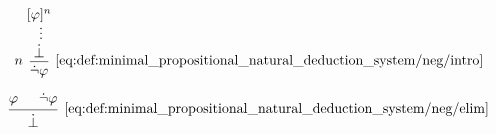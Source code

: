 \begin{definition}
\begin{thmenum}
    \begin{minipage}{0.45\textwidth}
      \begin{equation*}\taglabel[\( \neg^+ \)]{eq:def:minimal_propositional_natural_deduction_system/neg/intro}
        \begin{prooftree}
          \hypo{ [\varphi]^n }
          \ellipsis {} { \synbot }
          \infer[left label=\( n \)]1[\ref{eq:def:minimal_propositional_natural_deduction_system/neg/intro}]{ \synneg \varphi }
        \end{prooftree}
      \end{equation*}
    \end{minipage}
    \hfill
    \begin{minipage}{0.45\textwidth}
      \begin{equation*}\taglabel[\( \neg^- \)]{eq:def:minimal_propositional_natural_deduction_system/neg/elim}
        \begin{prooftree}
          \hypo{ \varphi }
          \hypo{ \synneg \varphi }
          \infer2[\ref{eq:def:minimal_propositional_natural_deduction_system/neg/elim}]{ \synbot }
        \end{prooftree}
      \end{equation*}
    \end{minipage}
  \end{thmenum}
\end{definition}
